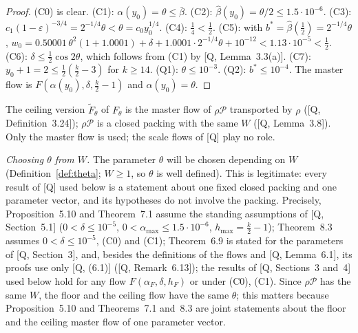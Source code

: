 \documentclass[11pt]{amsart}
\newcommand{\cP}{\mathcal P}
\newcommand{\amax}{\alpha_{\max}}
\newcommand{\bbar}{\bar\beta}
\theoremstyle{definition}
\theoremstyle{remark}
\numberwithin{equation}{section}
\begin{document}
\begin{proof}
(C0) is clear. (C1): $\alpha(y_0)=\theta\le\bbar$. (C2): $\hat\beta(y_0)=\theta/2\le1.5\cdot10^{-6}$. (C3):
$c_1(1-\varepsilon)^{-3/4}=2^{-1/4}\theta<\theta=c_0y_0^{1/4}$. (C4): $\frac14<\frac12$. (C5): with
$b^*=\hat\beta(\frac12)=2^{-1/4}\theta$,
$w_0=0.50001\,\theta^2(1+1.0001)+\delta+1.0001\cdot2^{-1/4}\theta+10^{-12}<1.13\cdot10^{-5}<\frac12$. (C6):
$\delta\le\frac12\cos2\theta$, which follows from (C1) by [Q, Lemma~3.3(a)]. (C7): $y_0+1=2\le\frac12(\frac k2-3)$ for $k\ge14$. (Q1): $\theta\le10^{-3}$. (Q2):
$b^*\le10^{-4}$. The master flow is $F(\alpha(y_0),\delta,\frac k2-1)$ and $\alpha(y_0)=\theta$.
\end{proof}

The ceiling version $\tilde F_\theta$ of $F_\theta$ is the master flow of $\rho\cP$ transported by $\rho$
([Q, Definition~3.24]); $\rho\cP$ is a closed packing with the same $W$ ([Q, Lemma~3.8]). Only the master flow is used;
the scale flows of [Q] play no role.

\emph{Choosing $\theta$ from $W$.} The parameter $\theta$ will be chosen depending on $W$ (Definition~\ref{def:theta};
$W\ge1$, so $\theta$ is well defined). This is legitimate: every result of [Q] used below is a statement about one fixed
closed packing and one parameter vector, and its hypotheses do not involve the packing. Precisely, Proposition~5.10 and
Theorem~7.1 assume the standing assumptions of [Q, Section~5.1] ($0<\delta\le10^{-5}$, $0<\amax\le1.5\cdot10^{-6}$,
$h_{\max}=\frac k2-1$); Theorem~8.3 assumes $0<\delta\le10^{-5}$, (C0) and (C1); Theorem~6.9 is stated for the parameters
of [Q, Section~3], and, besides the definitions of the flows and [Q, Lemma~6.1], its proofs use only [Q, (6.1)]
([Q, Remark~6.13]); the results of [Q, Sections~3 and~4] used below
hold for any flow $F(\alpha_F,\delta,h_F)$ or under (C0), (C1). Since $\rho\cP$ has the same $W$, the floor and the ceiling
flow have the same $\theta$; this matters because Proposition~5.10 and Theorems~7.1 and~8.3 are joint statements about the
floor and the ceiling master flow of one parameter vector.
\end{document}

